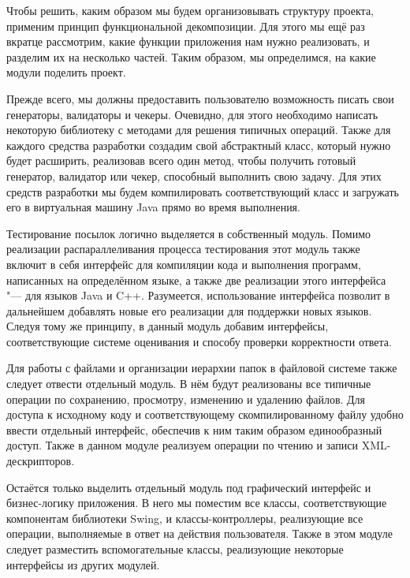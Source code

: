 Чтобы решить, каким образом мы будем организовывать структуру проекта, применим принцип функциональной декомпозиции. Для этого мы ещё раз вкратце рассмотрим, какие функции приложения нам нужно реализовать, и разделим их на несколько частей. Таким образом, мы определимся, на какие модули поделить проект.

Прежде всего, мы должны предоставить пользователю возможность писать свои генераторы, валидаторы и чекеры. Очевидно, для этого необходимо написать некоторую библиотеку с методами для решения типичных операций. Также для каждого средства разработки создадим свой абстрактный класс, который нужно будет расширить, реализовав всего один метод, чтобы получить готовый генератор, валидатор или чекер, способный выполнить свою задачу. Для этих средств разработки мы будем компилировать соответствующий класс и загружать его в виртуальная машину Java прямо во время выполнения.

Тестирование посылок логично выделяется в собственный модуль. Помимо реализации распараллеливания процесса тестирования этот модуль также включит в себя интерфейс для компиляции кода и выполнения программ, написанных на определённом языке, а также две реализации этого интерфейса "--- для языков Java и C++. Разумеется, использование интерфейса позволит в дальнейшем добавлять новые его реализации для поддержки новых языков. Следуя тому же принципу, в данный модуль добавим интерфейсы, соответствующие системе оценивания и способу проверки корректности ответа.

Для работы с файлами и организации иерархии папок в файловой системе также следует отвести отдельный модуль. В нём будут реализованы все типичные операции по сохранению, просмотру, изменению и удалению файлов. Для доступа к исходному коду и соответствующему скомпилированному файлу удобно ввести отдельный интерфейс, обеспечив к ним таким образом единообразный доступ. Также в данном модуле реализуем операции по чтению и записи XML-дескрипторов.

Остаётся только выделить отдельный модуль под графический интерфейс и бизнес-логику приложения. В него мы поместим все классы, соответствующие компонентам библиотеки Swing, и классы-контроллеры, реализующие все операции, выполняемые в ответ на действия пользователя. Также в этом модуле следует разместить вспомогательные классы, реализующие некоторые интерфейсы из других модулей.